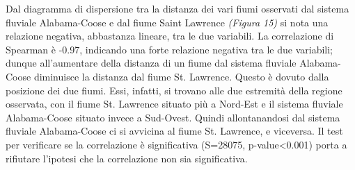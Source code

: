 \documentclass{article} %
\begin{document}
Dal diagramma di dispersione tra la distanza dei vari fiumi osservati dal sistema fluviale Alabama-Coose e dal fiume Saint Lawrence \textit{(Figura 15)} si nota una relazione negativa, abbastanza lineare, tra le due variabili.  
La correlazione di Spearman è -0.97, indicando una forte relazione negativa tra le due variabili; dunque all'aumentare della distanza di un fiume dal sistema fluviale Alabama-Coose diminuisce la distanza dal fiume St. Lawrence. 
Questo è dovuto dalla posizione dei due fiumi. Essi, infatti, si trovano alle due estremità della regione osservata, con il fiume St. Lawrence situato più a Nord-Est e il sistema fluviale Alabama-Coose situato invece a Sud-Ovest. Quindi allontanandosi dal sistema fluviale Alabama-Coose ci si avvicina al fiume St. Lawrence, e viceversa.
Il test per verificare se la correlazione è significativa (S=28075, p-value<0.001) porta a rifiutare l'ipotesi che la correlazione non sia significativa.
\end{document}
